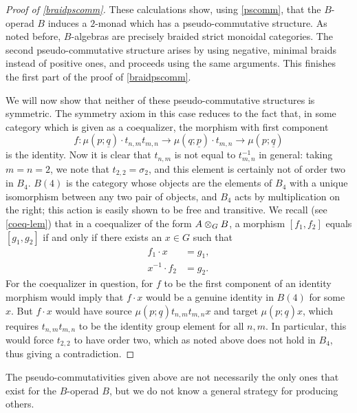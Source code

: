\begin{proof}[Proof of \cref{braidpscomm}]

These calculations show, using \cref{pscomm}, that the $B$-operad $B$ induces a $2$-monad which has a pseudo-commutative structure. As noted before, $B$-algebras are precisely braided strict monoidal categories. The second pseudo-commutative structure arises by using negative, minimal braids instead of positive ones, and proceeds using the same arguments. This finishes the first part of the proof of \cref{braidpscomm}.

We will now show that neither of these pseudo-commutative structures is symmetric. The symmetry axiom in this case reduces to the fact that, in some category which is given as a coequalizer, the morphism with first component
  \[
    f\colon \mu\left(p; \underline{q}\right) \cdot t_{n,m}t_{m,n} \rightarrow \mu\left(q; \underline{p}\right) \cdot t_{m,n} \rightarrow \mu\left(p; \underline{q}\right)
  \]
is the identity. Now it is clear that $t_{n,m}$ is not equal to $t_{m,n}^{-1}$ in general: taking $m=n=2$, we note that $t_{2,2} = \sigma_{2}$, and this element is certainly not of order two in $B_{4}$. $B(4)$ is the category whose objects are the elements of $B_{4}$ with a unique isomorphism between any two pair of objects, and $B_{4}$ acts by multiplication on the right; this action is easily shown to be free and transitive. We recall (see \cref{coeq-lem}) that in a coequalizer of the form $\coeqb{A}{B}{G}$, a morphism $[f_{1}, f_{2}]$ equals $[g_{1}, g_{2}]$ if and only if there exists an $x \in G$ such that
  \begin{align*}
    f_{1} \cdot x &= g_{1}, \\
    x^{-1} \cdot f_{2} &= g_{2}.
  \end{align*}
For the coequalizer in question, for $f$ to be the first component of an identity morphism would imply that $f \cdot x$ would be a genuine identity in $B(4)$ for some $x$. But $f \cdot x$ would have source $\mu\left(p; \underline{q}\right) t_{n,m}t_{m,n}x$ and target $\mu\left(p; \underline{q}\right)x$, which requires $t_{n,m}t_{m,n}$ to be the identity group element for all $n,m$. In particular, this would force $t_{2,2}$ to have order two, which as noted above does not hold in $B_{4}$, thus giving a contradiction.
\end{proof}

\begin{rem}
The pseudo-commutativities given above are not necessarily the only ones that exist for the $B$-operad $B$, but we do not know a general strategy for producing others.
\end{rem}

